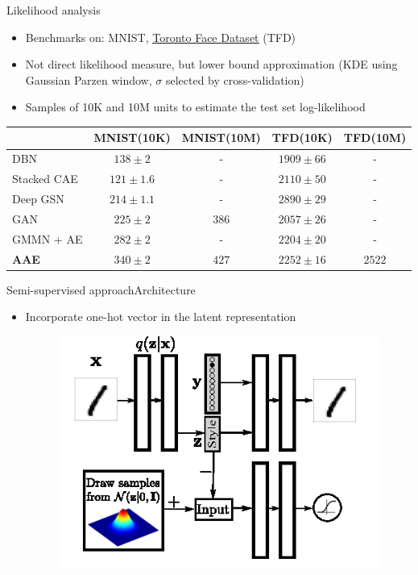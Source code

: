 \documentclass[10pt]{beamer}
\begin{document}
\begin{frame}{Likelihood analysis}
\begin{itemize}
  \item Benchmarks on: MNIST, \href{../images/tfd.gif}{\underline{Toronto Face Dataset}} (TFD)
  \item Not direct likelihood measure, but lower bound approximation (KDE using Gaussian Parzen window, $ \sigma $ selected by cross-validation)
  \item Samples of 10K and 10M units to estimate the test set log-likelihood
\end{itemize}
\begin{table}
  \centering
  \small
  \begin{tabular}{l||c||c||c||c}
    \toprule
                 &   MNIST(10K)    & MNIST(10M) &    TFD(10K)     & TFD(10M) \\ \midrule
    DBN          &  $ 138 \pm 2 $  &     -      & $ 1909 \pm 66 $ &    -     \\
    Stacked CAE  & $ 121 \pm 1.6 $ &     -      & $ 2110 \pm 50 $ &    -     \\
    Deep GSN     & $ 214 \pm 1.1 $ &     -      & $ 2890 \pm 29 $ &    -     \\
    GAN          &  $ 225 \pm 2 $  &  $ 386 $   & $ 2057 \pm 26 $ &    -     \\
    GMMN + AE    &  $ 282 \pm 2 $  &     -      & $ 2204 \pm 20 $ &    -     \\ \midrule
    \textbf{AAE} &  $ 340 \pm 2 $  &  $ 427 $   & $ 2252 \pm 16 $ & $ 2522 $ \\ \bottomrule
  \end{tabular}
\end{table}
\end{frame}

\begin{frame}{Semi-supervised approach}{Architecture}
\begin{itemize}
  \item Incorporate one-hot vector in the latent representation
  \begin{figure}
    \centering
    \includegraphics[width=0.6\linewidth]{../images/aae-architecture-02.png}
  \end{figure}
\end{itemize}
\end{frame}
\end{document}
